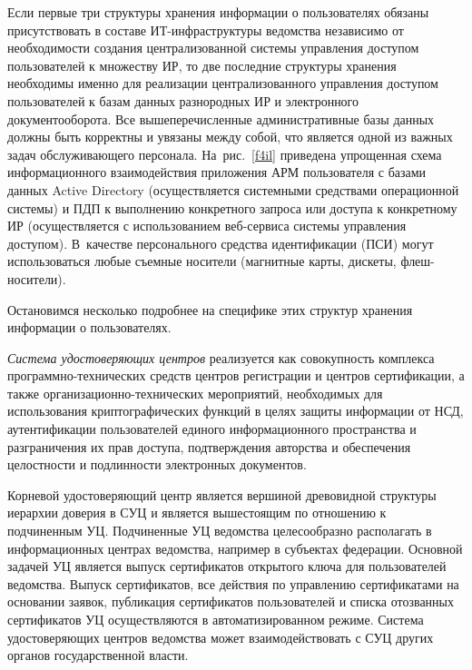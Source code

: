 \begin{multicols}{2}
      Если первые три структуры хранения информации о пользователях обязаны 
присутствовать в составе ИТ-ин\-фра\-струк\-ту\-ры ведомства независимо от необходимости 
создания централизованной\linebreak
 сис\-те\-мы управления доступом пользователей к множеству 
ИР, то две последние структуры хранения необходимы именно для 
реализации централизованного управления доступом пользователей к базам данных 
разнородных ИР и электронного документооборота. Все 
вышеперечисленные административные базы данных должны быть корректны и увязаны 
между собой, что является одной из важных задач обслу\-жи\-ва\-юще\-го персонала. 
На~рис.~\ref{f4il} приведена упрощенная схема информационного взаимодействия 
приложения АРМ пользователя с базами данных Active Directory (осуществляется системными 
средствами операционной системы) и ПДП к выполнению конкретного запроса или 
доступа к конкретному ИР (осуществляется с использованием 
      веб-сер\-ви\-са системы управления доступом). В~качестве персонального средства 
идентификации (ПСИ) могут использоваться любые съемные носители (магнитные карты, дискеты, 
флеш-носители).
 
      
      Остановимся несколько подробнее на специфике этих структур хранения информации 
о пользователях. 
      
      \textit{Система удостоверяющих центров} реализуется как совокупность 
комплекса прог\-рам\-мно-тех\-ни\-че\-ских средств центров регистрации и цент\-ров сертификации, а 
также орга\-ни\-за\-ци\-он\-но-тех\-ни\-че\-ских мероприятий, необходимых для использования 
криптографических функций в целях защиты информации от НСД, аутентификации 
пользователей единого информационного пространства 
и разграничения их прав доступа, подтверждения авторства и обеспечения 
целостности и подлинности электронных документов.
      
      Корневой удостоверяющий центр является вершиной древовидной структуры иерархии 
доверия в СУЦ и является вышестоящим по отношению к подчиненным УЦ. Подчиненные 
УЦ ведомства целесообразно располагать в информационных центрах ведомства, например в 
субъектах федерации. Основной задачей УЦ является выпуск сертификатов открытого ключа 
для пользователей ведомства. Выпуск сертификатов, все действия по управлению 
сертификатами на основании заявок, публикация сертификатов пользователей и списка 
отозванных сертификатов УЦ осуществляются в автоматизированном режиме. Система удостоверяющих центров ведомства 
может взаимодействовать с СУЦ других органов государственной власти.
      

\end{multicols}

